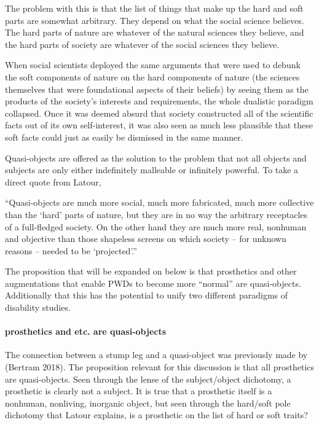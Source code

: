 \documentclass{lps}
\begin{document}
The problem with this is that the list of things that make up the hard and
soft parts are somewhat arbitrary. They depend on what the social science
believes. The hard parts of nature are whatever of the natural sciences they
believe, and the hard parts of society are whatever of the social sciences
they believe. 

When social scientists deployed the same arguments that were used to debunk
the soft components of nature on the hard components of nature (the sciences
themselves that were foundational aspects of their beliefs) by seeing them as
the products of the society’s interests and requirements, the whole dualistic
paradigm collapsed. Once it was deemed absurd that society constructed all of
the scientific facts out of its own self-interest, it was also seen as much
less plausible that these soft facts could just as easily be dismissed in the
same manner.

Quasi-objects are offered as the solution to the problem that not all objects
and subjects are only either indefinitely malleable or infinitely powerful. To
take a direct quote from Latour,

“Quasi-objects are much more social, much more fabricated, much more
collective than the ‘hard’ parts of nature, but they are in no way the
arbitrary receptacles of a full-fledged society. On the other hand they are
much more real, nonhuman and objective than those shapeless screens on which
society – for unknown reasons – needed to be ‘projected’.”

The proposition that will be expanded on below is that prosthetics and other
augmentations that enable PWDs to become more “normal” are quasi-objects.
Additionally that this has the potential to unify two different paradigms of
disability studies. 

\paragraph{prosthetics and etc. are quasi-objects}

The connection between a stump leg and a quasi-object was previously made by
(Bertram 2018). The proposition relevant for this discussion is that all
prosthetics are quasi-objects. Seen through the lense of the subject/object
dichotomy, a prosthetic is clearly not a subject. It is true that a prosthetic
itself is a nonhuman, nonliving, inorganic object, but seen through the
hard/soft pole dichotomy that Latour explains, is a prosthetic on the list of
hard or soft traits? 
\end{document}
